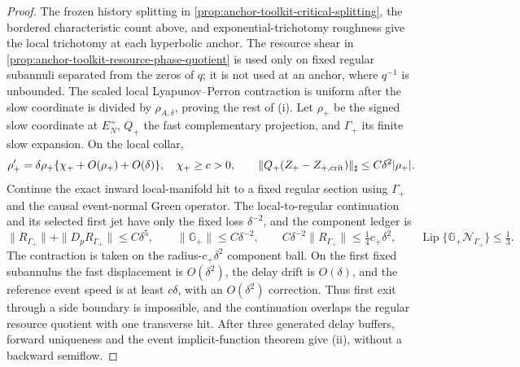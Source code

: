 \begin{proof}
The frozen history splitting in
\cref{prop:anchor-toolkit-critical-splitting}, the bordered characteristic
count above, and exponential-trichotomy roughness give the local trichotomy
at each hyperbolic anchor.  The resource shear in
\cref{prop:anchor-toolkit-resource-phase-quotient} is used only on fixed
regular subannuli separated from the zeros of \(q\); it is not used at an
anchor, where \(q^{-1}\) is unbounded.  The scaled local
Lyapunov--Perron contraction is uniform after
the slow coordinate is divided by \(\rho_{A,\delta}\), proving the rest of
(i).  Let \(\rho_+\) be the signed slow coordinate at \(E_N^+\), \(Q_+\) the
fast complementary projection, and \(\Gamma_+\) its finite slow expansion.
On the local collar,
\[
 \rho_+'=\delta\rho_+\{\chi_++O(\rho_+)+O(\delta)\},\quad \chi_+\ge c>0,
 \qquad
 \|Q_+(Z_+-Z_{+,{\rm crit}})\|_\sharp\le C\delta^2|\rho_+|.
\]
Continue the exact inward local-manifold hit to a fixed regular section using
\(\Gamma_+\) and the causal
event-normal Green operator.  The local-to-regular continuation and its
selected first jet have only the fixed loss \(\delta^{-2}\), and the
component ledger is
\begin{equation}
 \|R_{\Gamma_+}\|+\|D_pR_{\Gamma_+}\|\le C\delta^5,\qquad
 \|\mathbb G_+\|\le C\delta^{-2},\qquad
 C\delta^{-2}\|R_{\Gamma_+}\|\le\tfrac14c_+\delta^2,\qquad
 \operatorname{Lip}\{\mathbb G_+\mathcal N_{\Gamma_+}\}\le\tfrac13.
 \label{eq:lean-anchor-positive-ledger}
\end{equation}
The contraction is taken on the radius-\(c_+\delta^2\) component ball.
On the first fixed subannulus the fast displacement is \(O(\delta^2)\), the
delay drift is \(O(\delta)\), and the reference event speed is at least
\(c\delta\), with an \(O(\delta^2)\) correction.  Thus first exit through a
side boundary is impossible, and the continuation overlaps the regular
resource quotient with one transverse hit.
After three generated delay buffers, forward uniqueness and the event
implicit-function theorem give (ii), without a backward semiflow.


\end{proof}
